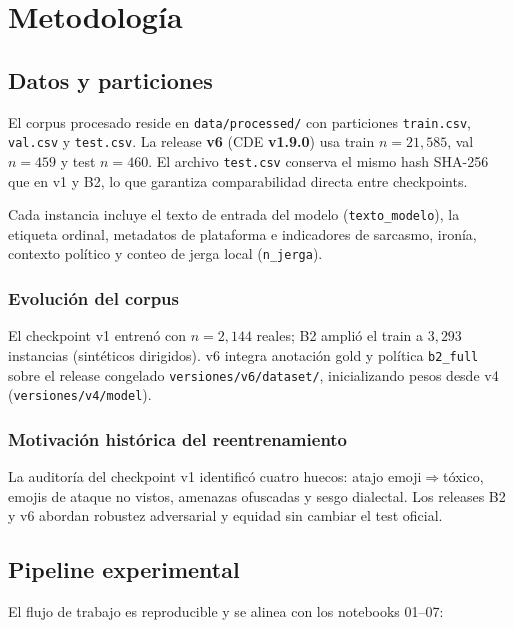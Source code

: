 \chapter{Metodología}
\label{ch:metodologia}

\section{Datos y particiones}

El corpus procesado reside en \texttt{data/processed/} con particiones
\texttt{train.csv}, \texttt{val.csv} y \texttt{test.csv}. La release
\textbf{v6} (CDE \textbf{v1.9.0}) usa train $n=21{,}585$, val $n=459$ y test
$n=460$. El archivo \texttt{test.csv} conserva el mismo hash SHA-256 que en v1 y
B2, lo que garantiza comparabilidad directa entre checkpoints.

Cada instancia incluye el texto de entrada del modelo
(\texttt{texto\_modelo}), la etiqueta ordinal, metadatos de plataforma e
indicadores de sarcasmo, ironía, contexto político y conteo de jerga local
(\texttt{n\_jerga}).

\subsection{Evolución del corpus}

El checkpoint v1 entrenó con $n=2{,}144$ reales; B2 amplió el train a
$3{,}293$ instancias (sintéticos dirigidos). v6 integra anotación gold y
política \texttt{b2\_full} sobre el release congelado
\texttt{versiones/v6/dataset/}, inicializando pesos desde v4
(\texttt{versiones/v4/model}).

\subsection{Motivación histórica del reentrenamiento}

La auditoría del checkpoint v1 identificó cuatro huecos: atajo
emoji$\Rightarrow$tóxico, emojis de ataque no vistos, amenazas ofuscadas y sesgo
dialectal. Los releases B2 y v6 abordan robustez adversarial y equidad sin
cambiar el test oficial.

\section{Pipeline experimental}

El flujo de trabajo es reproducible y se alinea con los notebooks 01--07:

